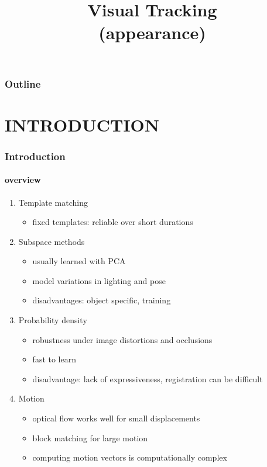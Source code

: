 
\title{Visual Tracking \\ (appearance)}
\begin{frame}[plain]\logoTechTower
	\titlepage
\end{frame}

\begin{frame}
\frametitle{Outline}
\logoCSIPCPL\logoTechTower
	\setcounter{tocdepth}{1}	
	\tableofcontents
\end{frame}

\section{INTRODUCTION}
\begin{frame}
\frametitle{Introduction}
\framesubtitle{overview}
\logoCSIPCPL\mypagenum
	\begin{enumerate}
		\item Template matching
			\begin{itemize}
				\item fixed templates: reliable over short durations
			\end{itemize}
		\item Subspace methods
			\begin{itemize}
				\item usually learned with PCA
				\item model variations in lighting and pose
				\item disadvantages: object specific, training
			\end{itemize}			
		\item Probability density
			\begin{itemize}
				\item robustness under image distortions and occlusions
				\item fast to learn
				\item disadvantage: lack of expressiveness, registration can be difficult
			\end{itemize}
		\item Motion
			\begin{itemize}
				\item optical flow works well for small displacements
				\item block matching for large motion
				\item computing motion vectors is computationally complex
			\end{itemize}
	\end{enumerate}
\end{frame}


